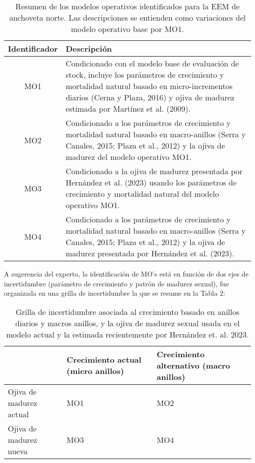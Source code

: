 \begin{table}[H] 
    \caption{Resumen de los modelos operativos identificados para la EEM de anchoveta norte. Las descripciones se entienden como variaciones del modelo operativo base por MO1.} 
    \label{tabla:MO}
    \begin{tabular}{cp{12cm}}
    \hline \hline
    \textbf{Identificador} & \textbf{Descripción} \\
    \hline \hline
    MO1 & Condicionado con el modelo base de evaluación de stock, incluye los parámetros de crecimiento y mortalidad natural basado en micro-incrementos diarios (Cerna y Plaza, 2016) y ojiva de madurez estimada por Martínez et al. (2009).\\
    \hline
    MO2 & Condicionado a los parámetros de crecimiento y mortalidad natural basado en macro-anillos (Serra y Canales, 2015; Plaza et al., 2012) y la ojiva de madurez del modelo operativo MO1. \\
    \hline
    MO3 & Condicionado a la ojiva de madurez presentada por Hernández et al. (2023) usando los parámetros de crecimiento y mortalidad natural del modelo operativo MO1.\\
    \hline
    MO4 & Condicionado a los parámetros de crecimiento y mortalidad natural basado en macro-anillos (Serra y Canales, 2015; Plaza et al., 2012) y la ojiva de madurez presentada por Hernández et al. (2023). \\ 
    \hline \hline
    \end{tabular}
\end{table}

A sugerencia del experto, la identificación de MO’s está en función de dos ejes de incertidumbre (parámetro de crecimiento y patrón de madurez sexual), fue organizada en una grilla de incertidumbre la que se resume en la Tabla 2: 


\begin{table}[h]
    \centering
    \caption{Grilla de incertidumbre asociada al crecimiento basado en anillos diarios y macros anillos, y la ojiva de madurez sexual usada en el modelo actual y la estimada recientemente por Hernández et. al. 2023.}
    \label{tab:tabla2}
    \begin{tabular}{|p{4.5cm}|p{3cm}|p{3cm}|}
        \hline
         & \textbf{Crecimiento actual
         (micro anillos)}
          &\textbf{Crecimiento alternativo
          (macro anillos)}
           \\
        \hline
        Ojiva de madurez actual & MO1 & MO2\\
        \hline
        Ojiva de madurez nueva & MO3 & MO4\\
        \hline
    \end{tabular}
\end{table}

